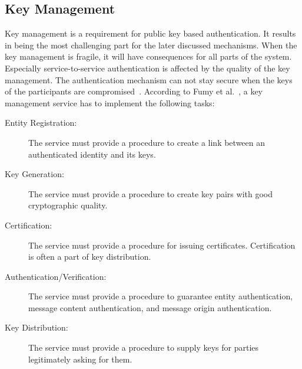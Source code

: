\subsection{Key Management} \label{sec:key_management}
Key management is a requirement for public key based authentication. 
It results in being the most challenging part for the later discussed mechanisms.
When the key management is fragile, it will have consequences for all parts of the system.
Especially service-to-service authentication is affected by the quality of the key management.
The authentication mechanism can not stay secure when the keys of the participants are compromised~\cite{dias2020microservices, fumy1993principles}.
According to Fumy et al.~\cite{fumy1993principles}, a key management service has to implement the following tasks:
\begin{description}
	\item[Entity Registration:] The service must provide a procedure to create a link between an authenticated identity and its keys.
	\item[Key Generation:] The service must provide a procedure to create key pairs with good cryptographic quality.
	\item[Certification:] The service must provide a procedure for issuing certificates. Certification is often a part of key distribution.
	\item[Authentication/Verification:] The service must provide a procedure to guarantee entity authentication, message content authentication, and message origin authentication.
	\item[Key Distribution:] The service must provide a procedure to supply keys for parties legitimately asking for them.
\end{description}

